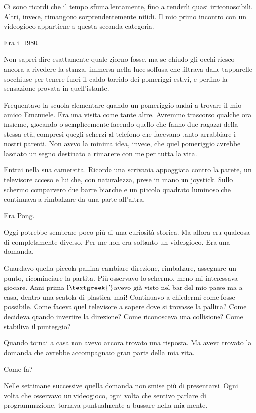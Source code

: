 \documentclass{article}
\author{utente}
\date{2026-08-20}
\begin{document}
Ci sono ricordi che il tempo sfuma lentamente, fino a renderli quasi irriconoscibili. Altri, invece, rimangono
sorprendentemente nitidi. Il mio primo incontro con un videogioco appartiene a questa seconda categoria.

Era il 1980.

Non saprei dire esattamente quale giorno fosse, ma se chiudo gli occhi riesco ancora a rivedere la stanza, immersa nella
luce soffusa che filtrava dalle tapparelle socchiuse per tenere fuori il caldo torrido dei pomeriggi estivi, e perfino
la sensazione provata in quell'istante.

Frequentavo la scuola elementare quando un pomeriggio andai a trovare il mio amico Emanuele. Era una visita come tante
altre. Avremmo trascorso qualche ora insieme, giocando o semplicemente facendo quello che fanno due ragazzi della
stessa età, compresi quegli scherzi al telefono che facevano tanto arrabbiare i nostri parenti. Non avevo la minima
idea, invece, che quel pomeriggio avrebbe lasciato un segno destinato a rimanere con me per tutta la vita.

Entrai nella sua cameretta. Ricordo una scrivania appoggiata contro la parete, un televisore acceso e lui che, con
naturalezza, prese in mano un joystick. Sullo schermo comparvero due barre bianche e un piccolo quadrato luminoso che
continuava a rimbalzare da una parte all'altra.

Era Pong.

Oggi potrebbe sembrare poco più di una curiosità storica. Ma allora era qualcosa di completamente diverso. Per me non
era soltanto un videogioco. Era una domanda.

Guardavo quella piccola pallina cambiare direzione, rimbalzare, assegnare un punto, ricominciare la partita. Più
osservavo lo schermo, meno mi interessava giocare. Anni prima l$\text{\textgreek{’}}$avevo già visto nel bar del mio
paese ma a casa, dentro una scatola di plastica, mai! Continuavo a chiedermi come fosse possibile. Come faceva quel
televisore a sapere dove si trovasse la pallina? Come decideva quando invertire la direzione? Come riconosceva una
collisione? Come stabiliva il punteggio?

Quando tornai a casa non avevo ancora trovato una risposta. Ma avevo trovato la domanda che avrebbe accompagnato gran
parte della mia vita.

Come fa?

Nelle settimane successive quella domanda non smise più di presentarsi. Ogni volta che osservavo un videogioco, ogni
volta che sentivo parlare di programmazione, tornava puntualmente a bussare nella mia mente.
\end{document}
